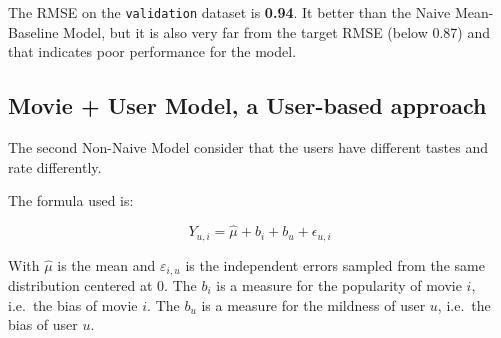 \documentclass[
]{article}
\begin{document}
The RMSE on the \texttt{validation} dataset is \textbf{0.94}. It better
than the Naive Mean-Baseline Model, but it is also very far from the
target RMSE (below 0.87) and that indicates poor performance for the
model.

\hypertarget{movie-user-model-a-user-based-approach}{%
\subsection{Movie + User Model, a User-based
approach}\label{movie-user-model-a-user-based-approach}}

The second Non-Naive Model consider that the users have different tastes
and rate differently.

The formula used is:

\[Y_{u,i} = \hat{\mu} + b_i + b_u + \epsilon_{u,i}\]

With \(\hat{\mu}\) is the mean and \(\varepsilon_{i,u}\) is the
independent errors sampled from the same distribution centered at 0. The
\(b_i\) is a measure for the popularity of movie \(i\), i.e.~the bias of
movie \(i\). The \(b_u\) is a measure for the mildness of user \(u\),
i.e.~the bias of user \(u\).
\end{document}
